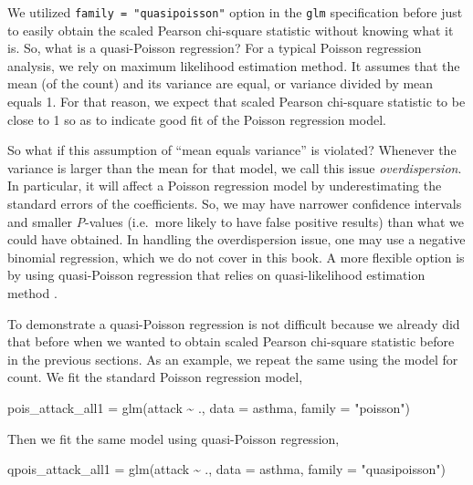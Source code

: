 \documentclass[
  10pt,
]{krantz}
\newenvironment{Shaded}{\begin{snugshade}}{\end{snugshade}}
\newcommand{\AttributeTok}[1]{\textcolor[rgb]{0.77,0.63,0.00}{#1}}
\newcommand{\FunctionTok}[1]{\textcolor[rgb]{0.00,0.00,0.00}{#1}}
\newcommand{\NormalTok}[1]{#1}
\newcommand{\OtherTok}[1]{\textcolor[rgb]{0.56,0.35,0.01}{#1}}
\newcommand{\SpecialCharTok}[1]{\textcolor[rgb]{0.00,0.00,0.00}{#1}}
\newcommand{\StringTok}[1]{\textcolor[rgb]{0.31,0.60,0.02}{#1}}
\begin{document}
We utilized \texttt{family\ =\ "quasipoisson"} option in the \texttt{glm} specification before just to easily obtain the scaled Pearson chi-square statistic without knowing what it is. So, what is a quasi-Poisson regression? For a typical Poisson regression analysis, we rely on maximum likelihood estimation method. It assumes that the mean (of the count) and its variance are equal, or variance divided by mean equals 1. For that reason, we expect that scaled Pearson chi-square statistic to be close to 1 so as to indicate good fit of the Poisson regression model.

So what if this assumption of ``mean equals variance'' is violated? Whenever the variance is larger than the mean for that model, we call this issue \emph{overdispersion}. In particular, it will affect a Poisson regression model by underestimating the standard errors of the coefficients. So, we may have narrower confidence intervals and smaller \emph{P}-values (i.e.~more likely to have false positive results) than what we could have obtained. In handling the overdispersion issue, one may use a negative binomial regression, which we do not cover in this book. A more flexible option is by using quasi-Poisson regression that relies on quasi-likelihood estimation method \citep{fleiss2003}.

To demonstrate a quasi-Poisson regression is not difficult because we already did that before when we wanted to obtain scaled Pearson chi-square statistic before in the previous sections. As an example, we repeat the same using the model for count. We fit the standard Poisson regression model,

\begin{Shaded}
\begin{Highlighting}[]
\NormalTok{pois\_attack\_all1 }\OtherTok{=} \FunctionTok{glm}\NormalTok{(attack }\SpecialCharTok{\textasciitilde{}}\NormalTok{ ., }\AttributeTok{data =}\NormalTok{ asthma, }\AttributeTok{family =} \StringTok{"poisson"}\NormalTok{)}
\end{Highlighting}
\end{Shaded}

Then we fit the same model using quasi-Poisson regression,

\begin{Shaded}
\begin{Highlighting}[]
\NormalTok{qpois\_attack\_all1 }\OtherTok{=} \FunctionTok{glm}\NormalTok{(attack }\SpecialCharTok{\textasciitilde{}}\NormalTok{ ., }\AttributeTok{data =}\NormalTok{ asthma, }
                        \AttributeTok{family =} \StringTok{"quasipoisson"}\NormalTok{)}
\end{Highlighting}
\end{Shaded}
\end{document}
